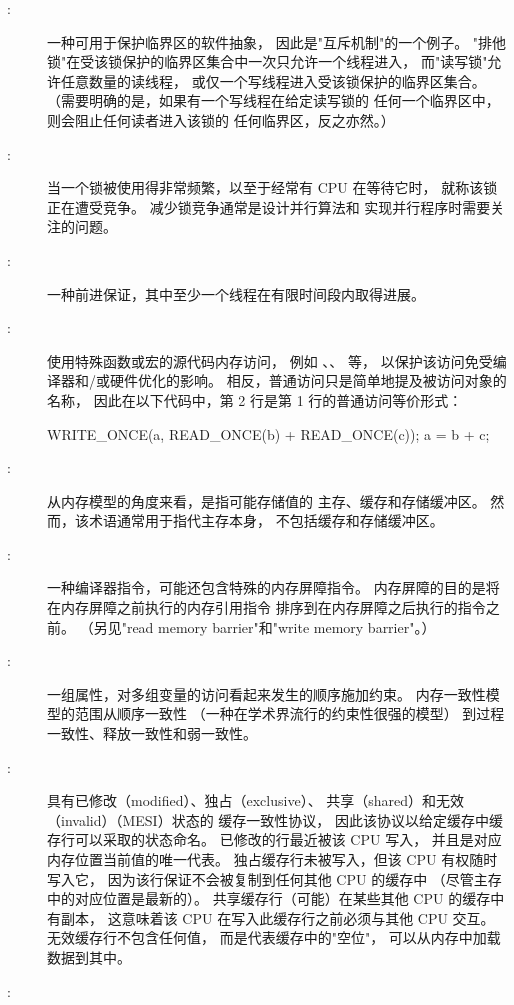 \begin{description}
\item[:]
	一种可用于保护临界区的软件抽象，
	因此是"互斥机制"的一个例子。
	"排他锁"在受该锁保护的临界区集合中一次只允许一个线程进入，
	而"读写锁"允许任意数量的读线程，
	或仅一个写线程进入受该锁保护的临界区集合。
	（需要明确的是，如果有一个写线程在给定读写锁的
	任何一个临界区中，则会阻止任何读者进入该锁的
	任何临界区，反之亦然。）
\item[:]
	当一个锁被使用得非常频繁，以至于经常有 CPU 在等待它时，
	就称该锁正在遭受竞争。
	减少锁竞争通常是设计并行算法和
	实现并行程序时需要关注的问题。
\item[:]
	一种前进保证，其中至少一个线程在有限时间段内取得进展。
\item[:]
	使用特殊函数或宏的源代码内存访问，
	例如 、、
	 等，
	以保护该访问免受编译器和/或硬件优化的影响。
	相反，普通访问只是简单地提及被访问对象的名称，
	因此在以下代码中，第 2 行是第 1 行的普通访问等价形式：
	\begin{VerbatimN}
	WRITE_ONCE(a, READ_ONCE(b) + READ_ONCE(c));
	a = b + c;
	\end{VerbatimN}
\item[:]
	从内存模型的角度来看，是指可能存储值的
	主存、缓存和存储缓冲区。
	然而，该术语通常用于指代主存本身，
	不包括缓存和存储缓冲区。
\item[:]
	一种编译器指令，可能还包含特殊的内存屏障指令。
	内存屏障的目的是将在内存屏障之前执行的内存引用指令
	排序到在内存屏障之后执行的指令之前。
	（另见"read memory barrier"和"write memory barrier"。）
\item[:]
	一组属性，对多组变量的访问看起来发生的顺序施加约束。
	内存一致性模型的范围从顺序一致性
	（一种在学术界流行的约束性很强的模型）
	到过程一致性、释放一致性和弱一致性。
\item[:]
	具有已修改（modified）、独占（exclusive）、
	共享（shared）和无效（invalid）（MESI）状态的
	缓存一致性协议，
	因此该协议以给定缓存中缓存行可以采取的状态命名。
	已修改的行最近被该 CPU 写入，
	并且是对应内存位置当前值的唯一代表。
	独占缓存行未被写入，但该 CPU 有权随时写入它，
	因为该行保证不会被复制到任何其他 CPU 的缓存中
	（尽管主存中的对应位置是最新的）。
	共享缓存行（可能）在某些其他 CPU 的缓存中有副本，
	这意味着该 CPU 在写入此缓存行之前必须与其他 CPU 交互。
	无效缓存行不包含任何值，
	而是代表缓存中的"空位"，
	可以从内存中加载数据到其中。
\item[:]

\end{description}
